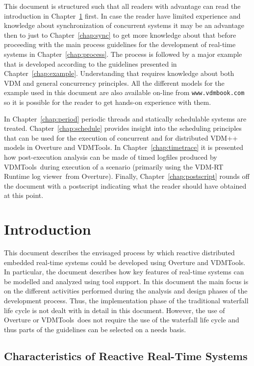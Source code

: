 \documentclass{overturerepchap}
\newcommand{\VDMTools}{VDMTools}
\newcommand{\showtrace}{VDM-RT Runtime log viewer}
\newcommand{\url}[1]{\texttt{#1}}
\begin{document}
This document is structured such that all readers with advantage can
read the introduction in Chapter~\ref{chap:intro} first. In case the
reader have limited experience and knowledge about synchronization of
concurrent systems it may be an advantage then to just to
Chapter~\ref{chap:sync} to get more knowledge about that before
proceeding with the main process guidelines for the development of
real-time systems in Chapter~\ref{chap:process}. The process is followed
by a major example that is developed according to the guidelines
presented in Chapter~\ref{chap:example}. Understanding that requires
knowledge about both VDM and general concurrency principles. All the 
different models for the example used in this document are also available
on-line from \url{www.vdmbook.com} so it is possible for the reader to 
get hands-on experience with them.

In 
Chapter~\ref{chap:period} periodic threads and statically schedulable
systems are treated. Chapter~\ref{chap:schedule} provides insight 
into the scheduling principles that can be used for the execution of
concurrent and for distributed VDM++ models in Overture and \VDMTools. In 
Chapter~\ref{chap:timetrace} it is presented how post-execution analysis
can be made of timed logfiles produced by \VDMTools\ during execution 
of a scenario (primarily using the \showtrace\ from Overture). 
Finally, Chapter~\ref{chap:postscript} rounds off the document with a 
postscript indicating what the reader should have obtained at this point.


\chapter{Introduction}\label{chap:intro}

This document describes the envisaged process by which reactive
distributed embedded real-time
systems could be developed using Overture and \VDMTools. In particular, the
document describes how key features of real-time systems can be
modelled and analyzed using tool support.  In this document the main
focus is on the different activities performed during the analysis and
design phases of the development process. Thus, the implementation
phase of the traditional waterfall life cycle \cite{Royce70} is not
dealt with in detail in this document. However, the use of Overture or
\VDMTools\
does not require the use of the waterfall life cycle and thus parts of
the guidelines can be selected on a needs basis.

\section{Characteristics of Reactive Real-Time Systems}
\end{document}
